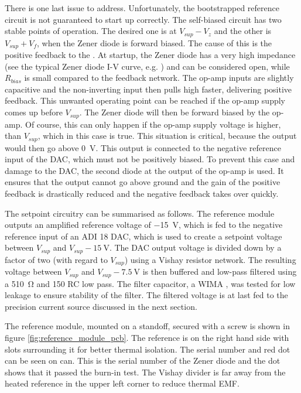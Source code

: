 There is one last issue to address. Unfortunately, the bootstrapped reference circuit is not guaranteed to start up correctly. The self-biased circuit has two stable points of operation. The desired one is at $V_{sup} - V_z$ and the other is $V_{sup} + V_f$, when the Zener diode is forward biased. The cause of this is the positive feedback to the . At startup, the Zener diode has a very high impedance (see the typical Zener diode I-V curve, e.g. \cite{fet_equations}) and can be considered open, while $R_{bias}$ is small compared to the feedback network. The op-amp inputs are slightly capacitive and the non-inverting input then pulls high faster, delivering positive feedback. This unwanted operating point can be reached if the op-amp supply comes up before $V_{sup}$. The Zener diode will then be forward biased by the op-amp. Of course, this can only happen if the op-amp supply voltage is higher, than $V_{sup}$, which in this case is true. This situation is critical, because the output would then go above \qty{0}{\V}. This output is connected to the negative reference input of the DAC, which must not be positively biased. To prevent this case and damage to the DAC, the second diode at the output of the op-amp is used. It ensures that the output cannot go above ground and the gain of the positive feedback is drastically reduced and the negative feedback takes over quickly.

The setpoint circuitry can be summarised as follows. The reference module outputs an amplified reference voltage of \qty{-15}{\V}, which is fed to the negative reference input of an ADI  \qty{18}{\bit} DAC, which is used to create a setpoint voltage between $V_{sup}$ and  $V_{sup} - \qty{15}{\V}$. The DAC output voltage is divided down by a factor of two (with regard to $V_{sup}$) using a Vishay  resistor network. The resulting voltage between $V_{sup}$ and  $V_{sup} - \qty{7.5}{\V}$ is then buffered and low-pass filtered using a \qty{510}{\ohm} and \qty{150}{\uF} RC low pass. The filter capacitor, a WIMA , was tested for low leakage to ensure stability of the filter. The filtered voltage is at last fed to the precision current source discussed in the next section.

The reference module, mounted on a standoff, secured with a screw is shown in figure \ref{fig:reference_module_pcb}. The reference is on the right hand side with slots surrounding it for better thermal isolation. The serial number and red dot can be seen on can. This is the serial number of the Zener diode and the dot shows that it passed the burn-in test. The Vishay  divider is far away from the heated reference in the upper left corner to reduce thermal EMF.

